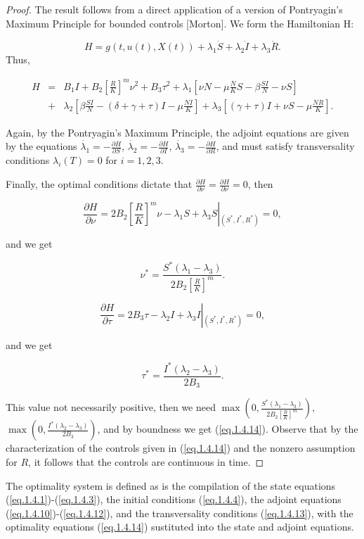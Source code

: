 \begin{proof}
The result follows from a direct application of a version of Pontryagin's Maximum Principle for bounded controls [Morton]. We form the Hamiltonian H:

$$H=g(t,u(t),X(t))+\lambda_1\dot{S}+\lambda_2\dot{I}+\lambda_3\dot{R}.$$
Thus,

\begin{eqnarray}\label{eq.1.4.15}
H&=&B_1I+B_2 [\frac{R}{K}]^m\nu^2+B_3\tau^2+\lambda_1[\nu N-\mu\frac{N}{K}S-\beta\frac{SI}{N}-\nu S]\nonumber\\
&+&\lambda_2[\beta \frac{SI}{N}-(\delta+\gamma+\tau)I-\mu\frac{NI}{K}]+\lambda_3[(\gamma+\tau)I+\nu S-\mu\frac{NR}{K}].
\end{eqnarray}

Again, by the Pontryagin's Maximum Principle, the adjoint equations are given by the equations $\dot{\lambda_1}=-\frac{\partial H}{\partial S}$, $\dot{\lambda_2}=-\frac{\partial H}{\partial I}$, $\dot{\lambda_3}=-\frac{\partial H}{\partial R}$, and must satisfy transversality conditions $\lambda_i(T)=0$ for $i=1,2,3$. 

Finally, the optimal conditions dictate that $\frac{\partial H}{\partial \nu}=\frac{\partial H}{\partial \nu}=0$, then

$$\frac{\partial H}{\partial \nu}=2B_2\left[\frac{R}{K}\right]^m\nu-\lambda_1 S+\lambda_3 S\left|_{(S^*,I^*,R^*)}\right.=0,$$

and we get 

$$\nu^*=\frac{S^*(\lambda_1-\lambda_3)}{2B_2\left[\frac{R}{K}\right]^m}.$$

$$\frac{\partial H}{\partial \tau}=2B_3\tau-\lambda_2 I+\lambda_3 I\left|_{(S^*,I^*,R^*)}\right.=0,$$

and we get 

$$\tau^*=\frac{I^*(\lambda_2 -\lambda_3)}{2B_3}.$$

This value not necessarily positive, then we need $\max\left (0,\frac{S^*(\lambda_1-\lambda_3)}{2B_2\left[\frac{R}{K}\right]^m}\right )$, $\max\left ( 0,\frac{I^*(\lambda_2 -\lambda_3)}{2B_3}\right )$, and by boundness we get (\ref{eq.1.4.14}). Observe that by the characterization of the controls given in (\ref{eq.1.4.14}) and the nonzero assumption for $R$, it follows that the controls are continuous in time.	
\end{proof}

The optimality system is defined as is the compilation of the state equations (\ref{eq.1.4.1})-(\ref{eq.1.4.3}), the initial conditions (\ref{eq.1.4.4}), the adjoint equations (\ref{eq.1.4.10})-(\ref{eq.1.4.12}), and the transversality conditions (\ref{eq.1.4.13}), with the optimality equations (\ref{eq.1.4.14}) sustituted into the state and adjoint equations.

